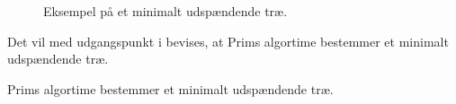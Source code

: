 \begin{figure}[!h]
  \centering
  
  \caption{Eksempel på et minimalt udspændende træ.}
  \label{eks_prim}
\end{figure}

Det vil med udgangspunkt i \cite{prim} bevises, at Prims algortime bestemmer et minimalt udspændende træ.

\begin{thm}
Prims algortime bestemmer et minimalt udspændende træ. 
\label{set_prim}
\end{thm}






